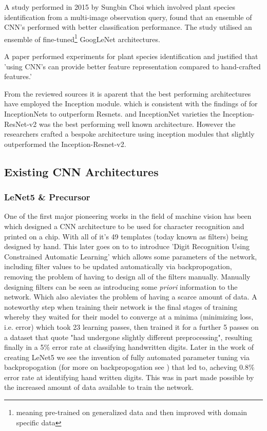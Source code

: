     \par
    A study performed in 2015 by Sungbin Choi \citep{Choi} which involved plant species identification from a multi-image observation query, found that an ensemble of CNN's performed with better classification performance. The study utilised an ensemble of fine-tuned\footnote[2]{meaning pre-trained on generalized data and then improved with domain specific data} GoogLeNet architectures.
    \par
    A paper \citep{Zhu2018} performed experiments for plant species identification and justified that 'using CNN's can provide better feature representation compared to hand-crafted features.' %
    \par
    From the reviewed sources it is aparent that the best performing architectures have employed the Inception \citep{Szegedy2015} module. which is consistent with the findings of \citep{Wu2019} for InceptionNets to outperform Resnets.  %
   \citep{He} and InceptionNet varieties the Inception-ResNet-v2 was the best performing well known architecture. However the researchers crafted a bespoke architecture using inception modules that slightly outperformed the Inception-Resnet-v2. %
  \subsection{Existing CNN Architectures}
  \subsubsection{LeNet5 \& Precursor}
    One of the first major pioneering works in the field of machine vision has been \citep{Cun1989} which designed a CNN architecture to be used for character recognition and printed on a chip. With all of it's 49 templates (today known as filters) being designed by hand. This later goes on to to introduce 'Digit Recognition Using Constrained Automatic Learning' which allows some parameters of the network, including filter values to be updated automatically via backpropogation, removing the problem of having to design all of the filters manually. Manually designing filters can be seen as introducing some \emph{priori} information to the network. Which also aleviates the problem of having a scarce amount of data. A noteworthy step when training their network is the final stages of training whereby they waited for their model to converge at a minima (minimizing loss, i.e. error) which took 23 learning passes, then trained it for a further 5 passes on a dataset that quote "had undergone slightly different preprocessing", resulting finally in a 5\% error rate at classifying handwritten digits. Later in the work of creating LeNet5 \citep{LeCun1998} we see the invention of fully automated parameter tuning via backpropogation (for more on backpropogation see \citep{CunYannle1988}) that led to, acheving 0.8\% error rate at identifying hand written digits. This was in part made possible by the increased amount of data available to train the network.
    \par
